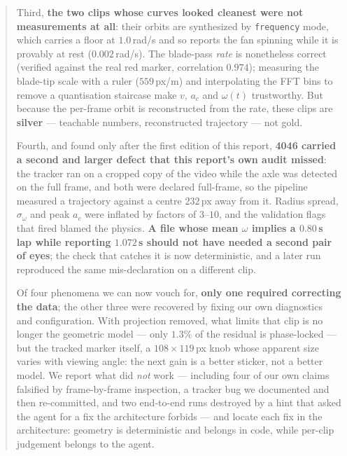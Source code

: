 \documentclass[11pt,a4paper]{article}
\begin{document}
\begin{abstract}
Third, \textbf{the two clips whose curves looked cleanest were not measurements at all}: their
orbits are synthesized by \texttt{frequency} mode, which carries a floor at $1.0$\,rad/s and so
reports the fan spinning while it is provably at rest ($0.002$\,rad/s). The blade-pass \emph{rate}
is nonetheless correct (verified against the real red marker, correlation $0.974$); measuring the
blade-tip scale with a ruler ($559$\,px/m) and interpolating the FFT bins to remove a quantisation
staircase make $v$, $a_c$ and $\omega(t)$ trustworthy. But because the per-frame orbit is
reconstructed from the rate, these clips are \textbf{silver} --- teachable numbers, reconstructed
trajectory --- not gold.

Fourth, and found only after the first edition of this report, \textbf{4046 carried a second and
larger defect that this report's own audit missed}: the tracker ran on a cropped copy of the video
while the axle was detected on the full frame, and both were declared full-frame, so the pipeline
measured a trajectory against a centre $232$\,px away from it. Radius spread, $\sigma_\omega$ and
peak $a_c$ were inflated by factors of $3$--$10$, and the validation flags that fired blamed the
physics. \textbf{A file whose mean $\omega$ implies a $0.80$\,s lap while reporting $1.072$\,s
should not have needed a second pair of eyes}; the check that catches it is now deterministic, and
a later run reproduced the same mis-declaration on a different clip.

Of four phenomena we can now vouch for, \textbf{only one required correcting the data}; the other
three were recovered by fixing our own diagnostics and configuration. With projection removed, what
limits that clip is no longer the geometric model --- only $1.3\%$ of the residual is
phase-locked --- but the tracked marker itself, a $108\times119$\,px knob whose apparent size varies
with viewing angle: the next gain is a better sticker, not a better model. We report what did
\emph{not} work --- including four of our own claims falsified by frame-by-frame inspection, a
tracker bug we documented and then re-committed, and two end-to-end runs destroyed by a hint that
asked the agent for a fix the architecture forbids --- and locate each fix in the architecture:
geometry is deterministic and belongs in code, while per-clip judgement belongs to the agent.
\end{abstract}

\tableofcontents
\newpage

\end{document}
